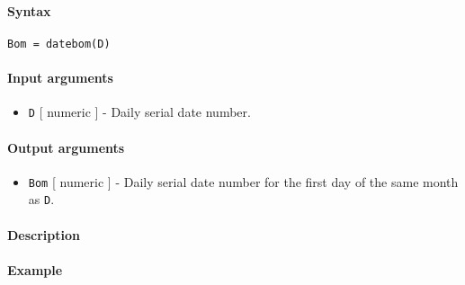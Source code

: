 


	\paragraph{Syntax}

\begin{verbatim}
Bom = datebom(D)
\end{verbatim}

\paragraph{Input arguments}

\begin{itemize}
\itemsep1pt\parskip0pt
\item
  \texttt{D} {[} numeric {]} - Daily serial date number.
\end{itemize}

\paragraph{Output arguments}

\begin{itemize}
\itemsep1pt\parskip0pt
\item
  \texttt{Bom} {[} numeric {]} - Daily serial date number for the first
  day of the same month as \texttt{D}.
\end{itemize}

\paragraph{Description}

\paragraph{Example}



